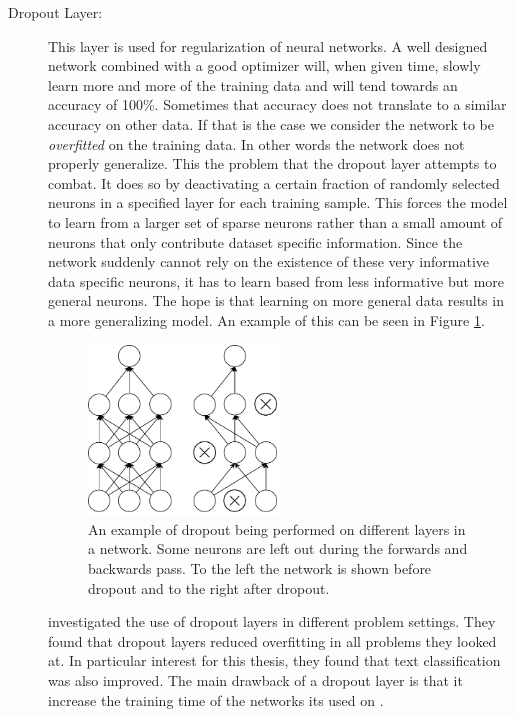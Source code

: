 \begin{description}
    \item[Dropout Layer:]

        This layer is used for regularization of neural networks. A well
        designed network combined with a good optimizer will, when given time,
        slowly learn more and more of the training data and will tend towards
        an accuracy of 100\%. Sometimes that accuracy does not translate to
        a similar accuracy on other data. If that is the case we consider
        the network to be \textit{overfitted} on the training data. In other
        words the network does not properly generalize. This the problem that
        the dropout layer attempts to combat. It does so by deactivating a
        certain fraction of randomly selected neurons in a specified layer for
        each training sample. This forces the model to learn from a larger
        set of sparse neurons rather than a small amount of neurons that only
        contribute dataset specific information. Since the network suddenly
        cannot rely on the existence of these very informative data specific
        neurons, it has to learn based from less informative but more general
        neurons. The hope is that learning on more general data results in
        a more generalizing model. An example of this can be seen in Figure
        \ref{fig:dropout}.

        \begin{figure}
            \centering
            \includegraphics[width=0.5\textwidth]{./pictures/method/dropout}
            \caption{An example of dropout being performed on different layers
                in a network. Some neurons are left out during the forwards and
                backwards pass. To the left the network is shown before dropout
                and to the right after dropout.}
            \label{fig:dropout}
        \end{figure}

        \citet{JMLR:v15:srivastava14a} investigated the use of dropout layers
        in different problem settings. They found that dropout layers reduced
        overfitting in all problems they looked at. In particular interest for
        this thesis, they found that text classification was also improved. The
        main drawback of a dropout layer is that it increase the training time
        of the networks its used on \citep{JMLR:v15:srivastava14a}.

\end{description}


